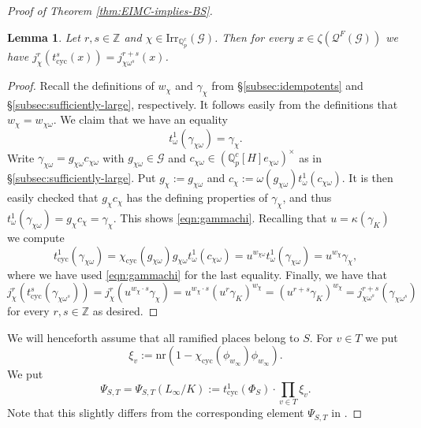 \documentclass[12pt]{amsart}
\theoremstyle{plain}
\newtheorem{lemma}[theorem]{Lemma}
\theoremstyle{remark}
\theoremstyle{definition}
\numberwithin{equation}{section}
\begin{document}
{\begin{proof}[Proof of Theorem \ref{thm:EIMC-implies-BS}]
\begin{lemma}  \label{lem:jchi-tcyc-composition}
Let $r,s \in {\mathbb{Z}}$ and $\chi \in {\mathrm{Irr}}_{{\mathbb{Q}}_p^{c}}(\mathcal{G})$. Then for every $x \in \zeta(\mathcal{Q}^{F}(\mathcal{G}))$
we have $j_{\chi}^{r}( t_{\mathrm{cyc}}^{s}(x)) = j_{\chi \omega^{s}}^{r+s}(x)$. 
\end{lemma}

\begin{proof}
 Recall the definitions of $w_{\chi}$ and $\gamma_{\chi}$ from \S \ref{subsec:idempotents} and 
\S \ref{subsec:sufficiently-large}, respectively. It follows easily from the definitions that $w_{\chi} = w_{\chi \omega}$.
We claim that we have an equality
\begin{equation} \label{eqn:gammachi}
t_{\omega}^{1}(\gamma_{\chi \omega}) = \gamma_{\chi}.
\end{equation}
Write $\gamma_{\chi \omega} = g_{\chi \omega} c_{\chi \omega}$ with
$g_{\chi \omega} \in \mathcal{G}$ and $c_{\chi \omega} \in ({\mathbb{Q}}_p^{c}[H] e_{\chi \omega})^{\times}$
as in \S \ref{subsec:sufficiently-large}. Put $g_{\chi} := g_{\chi \omega}$ and
$c_{\chi} := \omega(g_{\chi \omega}) t_{\omega}^{1}(c_{\chi \omega})$.
It is then easily checked that $g_{\chi} c_{\chi}$ has the defining properties of $\gamma_{\chi}$, and thus
$t_{\omega}^{1}(\gamma_{\chi \omega}) = g_{\chi} c_{\chi} = \gamma_{\chi}$. This shows \eqref{eqn:gammachi}.
Recalling that $u = \kappa(\gamma_{K})$ we compute
\[
t_{\mathrm{cyc}}^{1}(\gamma_{\chi \omega}) 
= \chi_{\mathrm{cyc}}(g_{\chi \omega}) g_{\chi \omega} t_{\omega}^{1} (c_{\chi \omega})
= u^{w_{\chi \omega}} t_{\omega}^{1}(\gamma_{\chi \omega})
=  u^{w_{\chi}} \gamma_{\chi},
\]
where we have used \eqref{eqn:gammachi} for the last equality. Finally, we have that
\[
j_{\chi}^{r} (t_{\mathrm{cyc}}^{s}(\gamma_{\chi \omega^{s}}))
= j_{\chi}^{r} (u^{w_{\chi} \cdot s} \gamma_{\chi})
=  u^{w_{\chi} \cdot s}(u^{r} \gamma_{K})^{w_{\chi}}
= (u^{r+s} \gamma_{K})^{w_{\chi}}
= j_{\chi \omega^{s}}^{r+s}(\gamma_{\chi \omega^{s}})
\]
for every $r,s \in {\mathbb{Z}}$ as desired.
\end{proof}

We will henceforth assume that all ramified places belong to $S$. 
For $v \in T$ we put
\[
\xi_{v} := {\mathrm{nr}}(1 - \chi_{\mathrm{cyc}}(\phi_{w_{\infty}}) \phi_{w_{\infty}}).
\]
We put
\[
\Psi_{S,T} = \Psi_{S,T}(L_{\infty} / K) :=  t_{\mathrm{cyc}}^{1}(\Phi_{S}) \cdot \prod_{v \in T} \xi_{v}.
\]
Note that this slightly differs from the corresponding element $\Psi_{S,T}$ in \cite{MR3072281}.


\end{proof}}
\end{document}
